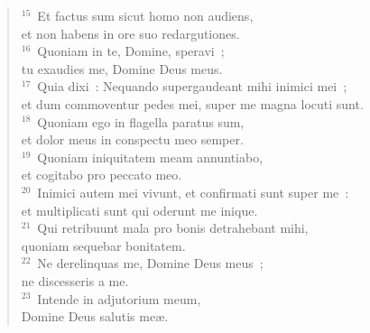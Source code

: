 \begin{verse}
${}^{15}$~Et factus sum sicut homo non audiens,\\ et non habens in ore suo redargutiones.\\
${}^{16}$~Quoniam in te, Domine, speravi~;\\ tu exaudies me, Domine Deus meus.\\
${}^{17}$~Quia dixi~: Nequando supergaudeant mihi inimici mei~;\\ et dum commoventur pedes mei, super me magna locuti sunt.\\
${}^{18}$~Quoniam ego in flagella paratus sum,\\ et dolor meus in conspectu meo semper.\\
${}^{19}$~Quoniam iniquitatem meam annuntiabo,\\ et cogitabo pro peccato meo.\\
${}^{20}$~Inimici autem mei vivunt, et confirmati sunt super me~:\\ et multiplicati sunt qui oderunt me inique.\\
${}^{21}$~Qui retribuunt mala pro bonis detrahebant mihi,\\ quoniam sequebar bonitatem.\\
${}^{22}$~Ne derelinquas me, Domine Deus meus~;\\ ne discesseris a me.\\
${}^{23}$~Intende in adjutorium meum,\\ Domine Deus salutis me\ae .\end{verse}



